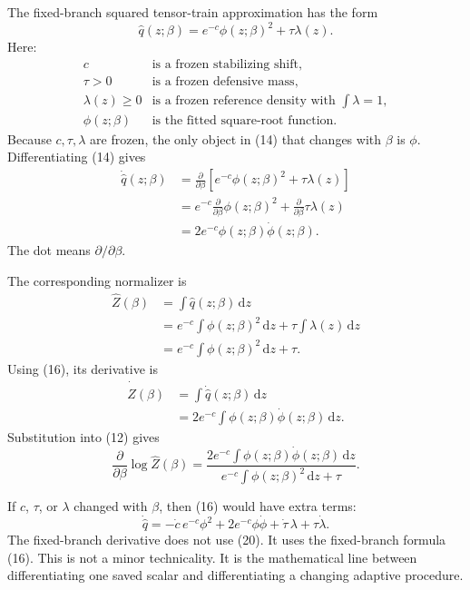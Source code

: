 \documentclass[11pt]{article}
\newcommand{\dd}{\,\mathrm d}
\begin{document}
The fixed-branch squared tensor-train approximation has the form
\[
    \widehat q(z;\beta)
    =
    e^{-c}\phi(z;\beta)^2+\tau\lambda(z).
    \tag{P19-14}
\]
Here:
\[
\begin{array}{ll}
c & \text{is a frozen stabilizing shift},\\
\tau>0 & \text{is a frozen defensive mass},\\
\lambda(z)\ge0 & \text{is a frozen reference density with }\int\lambda=1,\\
\phi(z;\beta) & \text{is the fitted square-root function.}
\end{array}
\tag{P19-15}
\]
Because \(c,\tau,\lambda\) are frozen, the only object in (14) that changes
with \(\beta\) is \(\phi\).  Differentiating (14) gives
\[
\begin{aligned}
    \dot{\widehat q}(z;\beta)
    &=
    \frac{\partial}{\partial\beta}
    \left[
    e^{-c}\phi(z;\beta)^2+\tau\lambda(z)
    \right]\\
    &=
    e^{-c}
    \frac{\partial}{\partial\beta}\phi(z;\beta)^2
    +
    \frac{\partial}{\partial\beta}\tau\lambda(z)\\
    &=
    2e^{-c}\phi(z;\beta)\dot\phi(z;\beta).
\end{aligned}
\tag{P19-16}
\]
The dot means \(\partial/\partial\beta\).

The corresponding normalizer is
\[
\begin{aligned}
    \widehat Z(\beta)
    &=
    \int \widehat q(z;\beta)\dd z\\
    &=
    e^{-c}\int \phi(z;\beta)^2\dd z
    +
    \tau\int\lambda(z)\dd z\\
    &=
    e^{-c}\int \phi(z;\beta)^2\dd z+\tau.
\end{aligned}
\tag{P19-17}
\]
Using (16), its derivative is
\[
\begin{aligned}
    \dot{\widehat Z}(\beta)
    &=
    \int \dot{\widehat q}(z;\beta)\dd z\\
    &=
    2e^{-c}
    \int \phi(z;\beta)\dot\phi(z;\beta)\dd z.
\end{aligned}
\tag{P19-18}
\]
Substitution into (12) gives
\[
    \frac{\partial}{\partial\beta}\log\widehat Z(\beta)
    =
    \frac{
    2e^{-c}\int \phi(z;\beta)\dot\phi(z;\beta)\dd z}
    {e^{-c}\int\phi(z;\beta)^2\dd z+\tau}.
    \tag{P19-19}
\]

If \(c\), \(\tau\), or \(\lambda\) changed with \(\beta\), then (16) would have
extra terms:
\[
    \dot{\widehat q}
    =
    -\dot c\,e^{-c}\phi^2
    +
    2e^{-c}\phi\dot\phi
    +
    \dot\tau\,\lambda
    +
    \tau\dot\lambda.
    \tag{P19-20}
\]
The fixed-branch derivative does not use (20).  It uses the fixed-branch
formula (16).  This is not a minor technicality.  It is the mathematical line
between differentiating one saved scalar and differentiating a changing
adaptive procedure.
\end{document}
